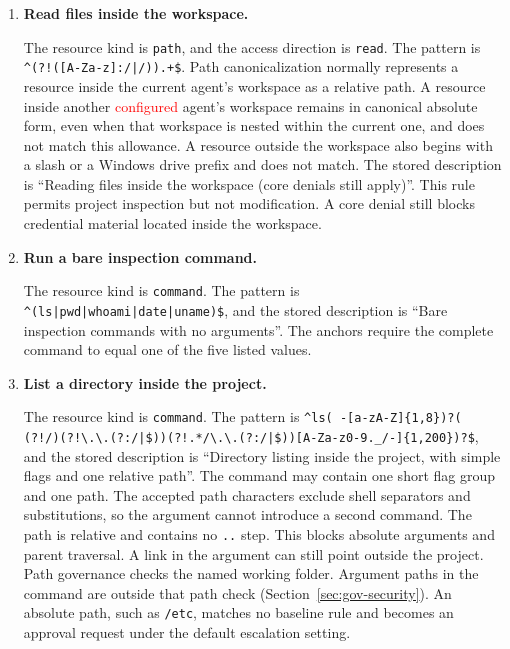 \begingroup
\setlength{\emergencystretch}{3em}
\begin{enumerate}
  \item \textbf{Read files inside the workspace.}

  The resource kind is \texttt{path}, and the access direction is
  \texttt{read}. The pattern is
  \lstinline[style=gpattern]~^(?!([A-Za-z]:/|/)).+$~. Path canonicalization normally represents
  a resource inside the current agent's workspace as a relative path. A
  resource inside another \textcolor{red}{configured} agent's workspace remains in canonical absolute form,
  even when that workspace is nested within the current one, and does not match
  this allowance. A resource outside the workspace also begins with a slash or
  a Windows drive prefix and does not match. The stored description is
  ``Reading files inside the workspace (core denials still apply)''. This rule
  permits project inspection but not modification. A core denial still blocks
  credential material located inside the workspace.

  \item \textbf{Run a bare inspection command.}

  The resource kind is \texttt{command}. The pattern is
  \lstinline[style=gpattern]~^(ls|pwd|whoami|date|uname)$~, and the stored description is
  ``Bare inspection commands with no arguments''. The anchors require the
  complete command to equal one of the five listed values.

  \item {\color{red}\textbf{List a directory inside the project.}

  The resource kind is \texttt{command}. The pattern is
  \lstinline[style=gpattern]~^ls( -[a-zA-Z]{1,8})?( (?!/)(?!\.\.(?:/|$))(?!.*/\.\.(?:/|$))[A-Za-z0-9._/-]{1,200})?$~,
  and the stored description is ``Directory listing inside the project, with
  simple flags and one relative path''. The command may contain one short flag
  group and one path. The accepted path characters exclude shell separators and
  substitutions, so the argument cannot introduce a second command. The path is
  relative and contains no \texttt{..} step. This blocks absolute arguments and
  parent traversal. A link in the argument can still point outside the project.
  Path governance checks the named working folder. Argument paths in the command
  are outside that path check (Section~\ref{sec:gov-security}). An absolute path, such as
  \texttt{/etc}, matches no baseline rule
  and becomes an approval request under the default escalation setting.}


\end{enumerate}
